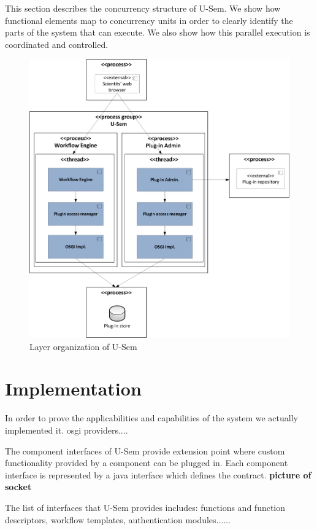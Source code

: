 This section describes the concurrency structure of U-Sem. We show how functional elements map to concurrency units in order to clearly identify the parts of the system that can execute. We also show how this parallel execution is coordinated and controlled.

\begin{figure}[h!]
  \centering
  	\includegraphics[scale=0.70]{plug-in/layers/concur.png}
  \caption{Layer organization of U-Sem}
\end{figure}

\section{Implementation}

In order to prove the applicabilities and capabilities of the system we actually implemented it.
osgi providers....

The component interfaces of U-Sem provide extension point where custom functionality provided by a component can be plugged in. Each component interface is represented by a java interface which defines the contract. \textbf{picture of socket}

The list of interfaces that U-Sem provides includes: functions and function descriptors, workflow templates, authentication modules......


